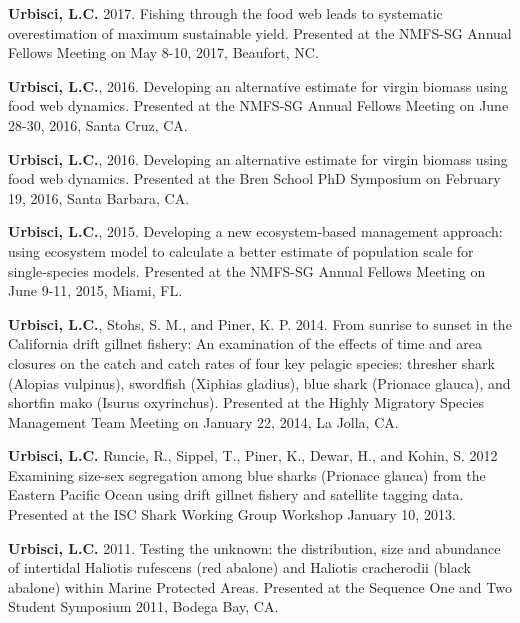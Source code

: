 \begin{vitae}
\textbf{Urbisci, L.C.} 2017. Fishing through the food web leads to systematic overestimation of maximum sustainable yield. Presented at the NMFS-SG Annual Fellows Meeting on May 8-10, 2017, Beaufort, NC. 

\textbf{Urbisci, L.C.}, 2016. Developing an alternative estimate for virgin biomass using food web dynamics. Presented at the NMFS-SG Annual Fellows Meeting on June 28-30, 2016, Santa Cruz, CA.

\textbf{Urbisci, L.C.}, 2016. Developing an alternative estimate for virgin biomass using food web dynamics. Presented at the Bren School PhD Symposium on February 19, 2016, Santa Barbara, CA.

\textbf{Urbisci, L.C.}, 2015. Developing a new ecosystem‐based management approach: using ecosystem model to calculate a better estimate of population scale for single‐species models. Presented at the NMFS-SG Annual Fellows Meeting on June 9-11, 2015, Miami, FL.

\textbf{Urbisci, L.C.}, Stohs, S. M., and Piner, K. P. 2014. From sunrise to sunset in the California drift gillnet fishery: An examination of the effects of time and area closures on the catch and catch rates of four key pelagic species: thresher shark (Alopias vulpinus), swordfish (Xiphias gladius), blue shark (Prionace glauca), and shortfin mako (Isurus oxyrinchus). Presented at the Highly Migratory Species Management Team Meeting on January 22, 2014, La Jolla, CA.

\textbf{Urbisci, L.C.} Runcie, R., Sippel, T., Piner, K., Dewar, H., and Kohin, S. 2012 Examining size-sex segregation among blue sharks (Prionace glauca) from the Eastern Pacific Ocean using drift gillnet fishery and satellite tagging data.  Presented at the ISC Shark Working Group Workshop January 10, 2013. 

\textbf{Urbisci, L.C.} 2011. Testing the unknown: the distribution, size and abundance of intertidal Haliotis rufescens (red abalone) and Haliotis cracherodii (black abalone) within Marine Protected Areas. Presented at the Sequence One and Two Student Symposium 2011, Bodega Bay, CA.

\end{vitae}